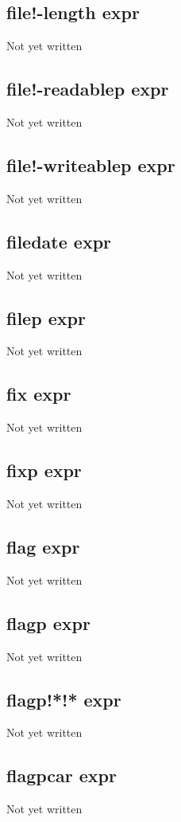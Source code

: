 \documentclass[a4paper,11pt]{article}
\begin{document}
\subsection{\ttfamily file!-length expr}
Not yet written

\subsection{\ttfamily file!-readablep expr}
Not yet written

\subsection{\ttfamily file!-writeablep expr}
Not yet written

\subsection{\ttfamily filedate expr}
Not yet written

\subsection{\ttfamily filep expr}
Not yet written

\subsection{\ttfamily fix expr}
Not yet written

\subsection{\ttfamily fixp expr}
Not yet written

\subsection{\ttfamily flag expr}
Not yet written

\subsection{\ttfamily flagp expr}
Not yet written

\subsection{\ttfamily flagp!*!* expr}
Not yet written

\subsection{\ttfamily flagpcar expr}
Not yet written
\end{document}
